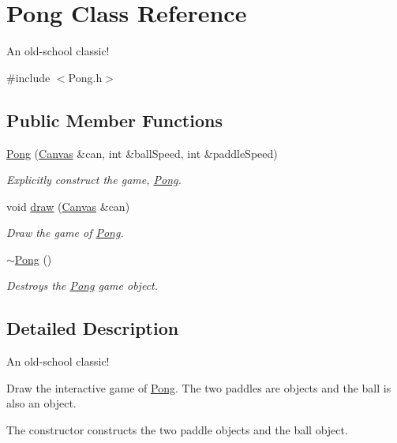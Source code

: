 \hypertarget{class_pong}{}\section{Pong Class Reference}
\label{class_pong}


An old-\/school classic!  




{\ttfamily \#include $<$Pong.\+h$>$}

\subsection*{Public Member Functions}
\begin{DoxyCompactItemize}
\item 
\hyperlink{class_pong_afc1bb4388485aeb675c3d2a854c8baf6}{Pong} (\hyperlink{classtsgl_1_1_canvas}{Canvas} \&can, int \&ball\+Speed, int \&paddle\+Speed)
\begin{DoxyCompactList}\small\item\em Explicitly construct the game, \hyperlink{class_pong}{Pong}. \end{DoxyCompactList}\item 
void \hyperlink{class_pong_a3c7242248be0e6980595faaa0a927866}{draw} (\hyperlink{classtsgl_1_1_canvas}{Canvas} \&can)
\begin{DoxyCompactList}\small\item\em Draw the game of \hyperlink{class_pong}{Pong}. \end{DoxyCompactList}\item 
\mbox{\label{class_pong_a51b1a3feee45026071eaba47489e504a}} 
\hyperlink{class_pong_a51b1a3feee45026071eaba47489e504a}{$\sim$\+Pong} ()
\begin{DoxyCompactList}\small\item\em Destroys the \hyperlink{class_pong}{Pong} game object. \end{DoxyCompactList}\end{DoxyCompactItemize}


\subsection{Detailed Description}
An old-\/school classic! 

Draw the interactive game of \hyperlink{class_pong}{Pong}. The two paddles are objects and the ball is also an object.

The constructor constructs the two paddle objects and the ball object.

